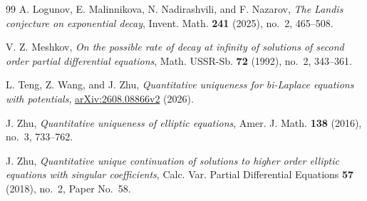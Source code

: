 \documentclass[11pt,twoside,leqno]{article}
\numberwithin{equation}{section}
\theoremstyle{definition}
\theoremstyle{remark}
\begin{document}
\begin{thebibliography}{99}
A. Logunov, E. Malinnikova, N. Nadirashvili, and F. Nazarov,
\emph{The Landis conjecture on exponential decay},
Invent. Math. \textbf{241} (2025), no.~2, 465--508.

V. Z. Meshkov, \emph{On the possible rate of decay at infinity of
solutions of second order partial differential equations},
Math. USSR-Sb. \textbf{72} (1992), no.~2, 343--361.

L. Teng, Z. Wang, and J. Zhu,
\emph{Quantitative uniqueness for bi-Laplace equations with potentials},
\href{https://arxiv.org/abs/2608.08866v2}{arXiv:2608.08866v2} (2026).

J. Zhu, \emph{Quantitative uniqueness of elliptic equations},
Amer. J. Math. \textbf{138} (2016), no.~3, 733--762.

J. Zhu, \emph{Quantitative unique continuation of solutions to higher
order elliptic equations with singular coefficients},
Calc. Var. Partial Differential Equations \textbf{57} (2018), no.~2,
Paper No.~58.

\end{thebibliography}
\end{document}
